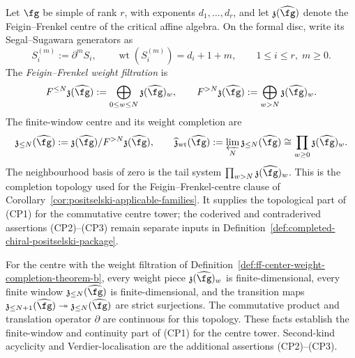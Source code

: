 \begin{definition}
\label{def:ff-center-weight-completion-theorem-b}
Let \(\fg\) be simple of rank \(r\), with exponents
\(d_1,\ldots,d_r\), and let
\(\mathfrak z(\widehat{\fg})\) denote the Feigin--Frenkel centre of
the critical affine algebra. On the formal disc, write its
Segal--Sugawara generators as
\[
S_i^{(m)}:=\partial^m S_i,\qquad
\operatorname{wt}(S_i^{(m)})=d_i+1+m,\qquad
1\leq i\leq r,\; m\geq0 .
\]
The \emph{Feigin--Frenkel weight filtration} is
\[
F^{\leq N}\mathfrak z(\widehat{\fg})
:=
\bigoplus_{0\leq w\leq N}\mathfrak z(\widehat{\fg})_w,
\qquad
F^{>N}\mathfrak z(\widehat{\fg})
:=
\bigoplus_{w>N}\mathfrak z(\widehat{\fg})_w .
\]
The finite-window centre and its weight completion are
\[
\mathfrak z_{\leq N}(\widehat{\fg})
:=
\mathfrak z(\widehat{\fg})/
F^{>N}\mathfrak z(\widehat{\fg}),
\qquad
\widehat{\mathfrak z}_{\mathrm{wt}}(\widehat{\fg})
:=
\varprojlim_N \mathfrak z_{\leq N}(\widehat{\fg})
\cong
\prod_{w\geq0}\mathfrak z(\widehat{\fg})_w .
\]
The neighbourhood basis of zero is the tail system
\(\prod_{w>N}\mathfrak z(\widehat{\fg})_w\). This is the completion
topology used for the Feigin--Frenkel-centre clause of
Corollary~\ref{cor:positselski-applicable-families}.  It supplies the
topological part of \textup{(CP1)} for the commutative centre tower;
the coderived and contraderived assertions \textup{(CP2)}--\textup{(CP3)}
remain separate inputs in
Definition~\ref{def:completed-chiral-positselski-package}.
\end{definition}

\begin{lemma}
\label{lem:ff-center-finite-weight-windows}
For the centre with the weight filtration of
Definition~\ref{def:ff-center-weight-completion-theorem-b}, every
weight piece \(\mathfrak z(\widehat{\fg})_w\) is finite-dimensional,
every finite window
\(\mathfrak z_{\leq N}(\widehat{\fg})\) is finite-dimensional, and the
transition maps
\(\mathfrak z_{\leq N+1}(\widehat{\fg})\twoheadrightarrow
\mathfrak z_{\leq N}(\widehat{\fg})\) are strict surjections. The
commutative product and translation operator \(\partial\) are continuous
for this topology. These facts establish the finite-window and continuity
part of \textup{(CP1)} for the centre tower.  Second-kind acyclicity
and Verdier-localisation are the additional assertions
\textup{(CP2)}--\textup{(CP3)}.
\end{lemma}

